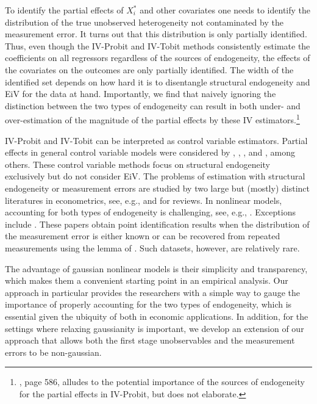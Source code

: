 \documentclass[12pt]{article}
\begin{document}
To identify the partial effects of $X_{i}^{\ast }$ and other covariates one
needs to identify the distribution of the true unobserved heterogeneity not
contaminated by the measurement error. It turns out that this distribution
is only partially identified. Thus, even though the IV-Probit and IV-Tobit
methods consistently estimate the coefficients on all regressors regardless
of the sources of endogeneity, the effects of the covariates on the outcomes
are only partially identified. The width of the identified set depends on
how hard it is to disentangle structural endogeneity and EiV for the data at
hand. Importantly, we find that naively ignoring the distinction between the
two types of endogeneity can result in both under- and over-estimation of
the magnitude of the partial effects by these IV estimators.\footnote{\cite%
{Wooldridge2010Book}, page 586, alludes to the potential importance of the
sources of endogeneity for the partial effects in IV-Probit, but does not
elaborate.}

IV-Probit and IV-Tobit can be interpreted as control variable estimators.
Partial effects in general control variable models were considered by \cite%
{BlundellPowell2003Advances}, \cite{Chesher2003Ecta}, \cite%
{ImbensNewey2009Ecta}, and \cite{Wooldridge2005APE,Wooldridge2015JHR}, among
others. These control variable methods focus on structural endogeneity
exclusively but do not consider EiV. The problems of estimation with
structural endogeneity or measurement errors are studied by two large but
(mostly) distinct literatures in econometrics, see, e.g., \cite%
{Matzkin2013AnnRev} and \cite{Schennach2020HB-ME} for reviews. In nonlinear
models, accounting for both types of endogeneity is challenging, see, e.g., 
\cite{Schennach2022JEcLit}. Exceptions include \cite%
{AdusumilliOtsu2018ET,SongSchennachWhite2015QE,SchennachWhiteChalak2012JoE,HahnRidder2017JoE}%
. These papers obtain point identification results when the distribution of
the measurement error is either known or can be recovered from repeated
measurements using the lemma of \cite{Kotlarski1967}. Such datasets,
however, are relatively rare.

The advantage of gaussian nonlinear models is their simplicity and
transparency, which makes them a convenient starting point in an empirical
analysis. Our approach in particular provides the researchers with a simple
way to gauge the importance of properly accounting for the two types of
endogeneity, which is essential given the ubiquity of both in economic
applications. In addition, for the settings where relaxing gaussianity is
important, we develop an extension of our approach that allows both the
first stage unobservables and the measurement errors to be non-gaussian.
\end{document}
